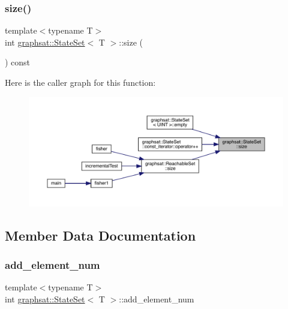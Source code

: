 \subsubsection{\texorpdfstring{size()}{size()}}
{\footnotesize\ttfamily template$<$typename T$>$ \\
int \mbox{\hyperlink{classgraphsat_1_1_state_set}{graphsat\+::\+State\+Set}}$<$ T $>$\+::size (\begin{DoxyParamCaption}{ }\end{DoxyParamCaption}) const\hspace{0.3cm}{\ttfamily [inline]}}

Here is the caller graph for this function\+:
\nopagebreak
\begin{figure}[H]
\begin{center}
\leavevmode
\includegraphics[width=350pt]{classgraphsat_1_1_state_set_a2ba142c5b450dd427534c48c4a9e0791_icgraph}
\end{center}
\end{figure}


\subsection{Member Data Documentation}
\mbox{\label{classgraphsat_1_1_state_set_abaedb0e8a95f8b933a58165d0e8b984d}} 
\subsubsection{\texorpdfstring{add\_element\_num}{add\_element\_num}}
{\footnotesize\ttfamily template$<$typename T$>$ \\
int \mbox{\hyperlink{classgraphsat_1_1_state_set}{graphsat\+::\+State\+Set}}$<$ T $>$\+::add\+\_\+element\+\_\+num\hspace{0.3cm}{\ttfamily [private]}}

